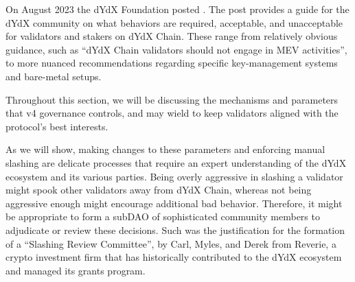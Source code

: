     On August 2023 the dYdX Foundation posted . The post provides a guide for the dYdX community on what behaviors are required, acceptable, and unacceptable for validators and stakers on dYdX Chain. These range from relatively obvious guidance, such as ``dYdX Chain validators should not engage in MEV activities'', to more nuanced recommendations regarding specific key-management systems and bare-metal setups. 

    Throughout this section, we will be discussing the mechanisms and parameters that v4 governance controls, and may wield to keep validators aligned with the protocol's best interests. 
    
    As we will show, making changes to these parameters and enforcing manual slashing are delicate processes that require an expert understanding of the dYdX ecosystem and its various parties. Being overly aggressive in slashing a validator might spook other validators away from dYdX Chain, whereas not being aggressive enough might encourage additional bad behavior. Therefore, it might be appropriate to form a subDAO of sophisticated community members to adjudicate or review these decisions. Such was the justification for the formation of a ``Slashing Review Committee'',  by Carl, Myles, and Derek from Reverie, a crypto investment firm that has historically contributed to the dYdX ecosystem and managed its grants program.

